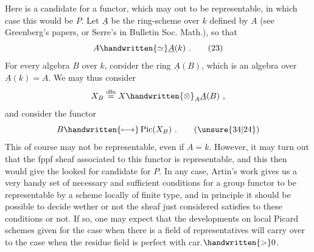 Here is a candidate for a functor, which may  out to be representable, in which case this would be $P$. Let $\underline{A}$ be the ring-scheme over $k$ defined by $A$ (see Greenberg's papers, or Serre's in Bulletin Soc. Math.), so that
\[
A\handwritten{\simeq}\underline{A}(k)\ .
\tag*{(23)}
\]
For every algebra $B$ over $k$, corsider the ring $\underline{A}(B)$, which is an algebra over $\underline{A}(k)=A$. We may thus consider
\[
X_B\overset{\mathrm{dfn}}{=}X\handwritten{\otimes}_A\underline{A}(B)\ ,
\]
and consider the functor
\[
B\handwritten{\longmapsto}\operatorname{Pic}(X_B)\ .
\tag*{(\unsure{34|24})}
\]
This of course may not be representable, even if $A=k$. However, it may turn out that the fppf sheaf associated to this functor is representable, and this then would give the looked for candidate for $P$. In any case, Artin's work gives us a very handy set of necessary and sufficient conditions for a group functor to be representable by a scheme locally of finite type, and in principle it should be possible to decide wether or not the  sheaf just considered satisfies to these conditions or not. If so, one may expect that the developments on local Picard schemes given for the case when there is a field of representatives will carry over to the case when the residue field is perfect with car.$\handwritten{>}0$.
